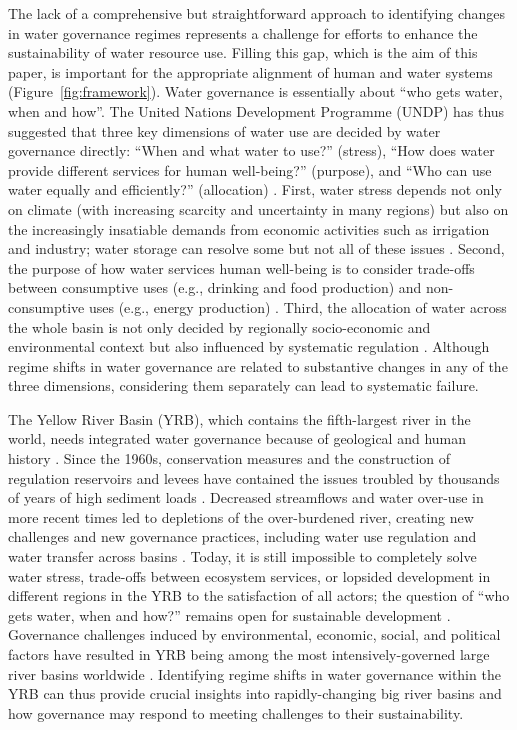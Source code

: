 The lack of a comprehensive but straightforward approach to identifying changes in water governance regimes represents a challenge for efforts to enhance the sustainability of water resource use.
Filling this gap, which is the aim of this paper, is important for the appropriate alignment of human and water systems (Figure~\ref{fig:framework}).
Water governance is essentially about ``who gets water, when and how''\cite{lasswell2018}. The United Nations Development Programme (UNDP) has thus suggested that three key dimensions of water use are decided by water governance directly: ``When and what water to use?'' (stress), ``How does water provide different services for human well-being?'' (purpose), and ``Who can use water equally and efficiently?'' (allocation)
\cite{undpwatergovernancefacility2016}.
First, water stress depends not only on climate (with increasing scarcity and uncertainty in many regions) but also on the increasingly insatiable demands from economic activities such as irrigation and industry; water storage can resolve some but not all of these issues
\cite{qin2019,wada2014,huang2021}.
Second, the purpose of how water services human well-being is to consider trade-offs between consumptive uses (e.g., drinking and food production) and non-consumptive uses (e.g., energy production)
\cite{liu2017,florke2018,jaeger2019}.
Third, the allocation of water across the whole basin is not only decided by regionally socio-economic and environmental context but also influenced by systematic regulation
\cite{schmandt2021,speed2013}.
Although regime shifts in water governance are related to substantive changes in any of the three dimensions, considering them separately can lead to systematic failure.

The Yellow River Basin (YRB), which contains the fifth-largest river in the world, needs integrated water governance because of geological and human history
\cite{mostern2021}.
Since the 1960s, conservation measures and the construction of regulation reservoirs and levees have contained the issues troubled by thousands of years of high sediment loads
\cite{wang2016e,song2020a}.
Decreased streamflows and water over-use in more recent times led to depletions of the over-burdened river, creating new challenges and new governance practices, including water use regulation and water transfer across basins
\cite{wang2019c}.
Today, it is still impossible to completely solve water stress, trade-offs between ecosystem services, or lopsided development in different regions in the YRB to the satisfaction of all actors; the question of ``who gets water, when and how?'' remains open for sustainable development
\cite{wohlfart2016a}.
Governance challenges induced by environmental, economic, social, and political factors have resulted in YRB being among the most intensively-governed large river basins worldwide \cite{nickum2021}.
Identifying regime shifts in water governance within the YRB can thus provide crucial insights into rapidly-changing big river basins and how governance may respond to meeting challenges to their sustainability.

